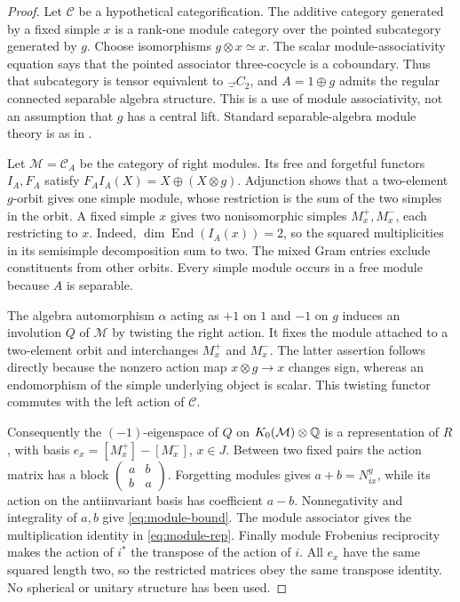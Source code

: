 \begin{proof}
Let $\mathcal C$ be a hypothetical categorification. The additive category
generated by a fixed simple $x$ is a rank-one module category over the
pointed subcategory generated by $g$. Choose isomorphisms $g\otimes x\simeq x$.
The scalar module-associativity equation says that the pointed associator
three-cocycle is a coboundary. Thus that subcategory is tensor equivalent
to $\Vec_{C_2}$, and $A=1\oplus g$ admits the regular connected separable
algebra structure. This is a use of module associativity, not an assumption
that $g$ has a central lift. Standard separable-algebra module theory is
as in \cite[Chapter~7]{EGNO}.

Let $\mathcal M=\mathcal C_A$ be the category of right modules. Its free
and forgetful functors $I_A,F_A$ satisfy
$F_AI_A(X)=X\oplus(X\otimes g)$. Adjunction shows that a two-element
$g$-orbit gives one simple module, whose restriction is the sum of the two
simples in the orbit. A fixed simple $x$ gives two nonisomorphic simples
$M_x^+,M_x^-$, each restricting to $x$. Indeed,
$\dim\operatorname{End}(I_A(x))=2$, so the squared multiplicities in its
semisimple decomposition sum to two. The mixed Gram entries exclude
constituents from other orbits. Every simple module occurs in a free
module because $A$ is separable.

The algebra automorphism $\alpha$ acting as $+1$ on $1$ and $-1$ on $g$
induces an involution $Q$ of $\mathcal M$ by twisting the right action.
It fixes the module attached to a two-element orbit and interchanges
$M_x^+$ and $M_x^-$. The latter assertion follows directly because the
nonzero action map $x\otimes g\to x$ changes sign, whereas an
endomorphism of the simple underlying object is scalar. This twisting
functor commutes with the left action of $\mathcal C$.

Consequently the $(-1)$-eigenspace of $Q$ on $K_0(\mathcal M)\otimes\mathbb Q$
is a representation of $R$, with basis
$e_x=[M_x^+]-[M_x^-]$, $x\in J$. Between two fixed pairs the action matrix
has a block $\left(\begin{smallmatrix}a&b\\b&a\end{smallmatrix}\right)$.
Forgetting modules gives $a+b=N_{ix}^{y}$, while its action on the
antiinvariant basis has coefficient $a-b$. Nonnegativity and integrality
of $a,b$ give \eqref{eq:module-bound}. The module associator gives the
multiplication identity in \eqref{eq:module-rep}. Finally module
Frobenius reciprocity makes the action of $i^*$ the transpose of the
action of $i$. All $e_x$ have the same squared length two, so the
restricted matrices obey the same transpose identity. No spherical or
unitary structure has been used.
\end{proof}

